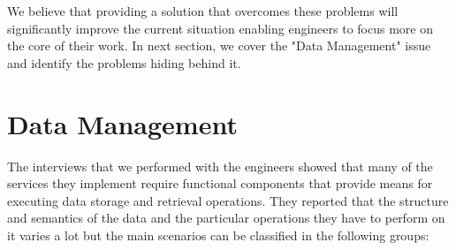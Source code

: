 We believe that providing a solution that overcomes these problems will significantly improve the current situation enabling engineers to focus more on the core of their work. In next section, we cover the "Data Management" issue and identify the problems hiding behind it.


\section{Data Management}
\label{sec:problemDefStorage}

The interviews that we performed with the engineers showed that many of the services they implement require functional components that provide means for executing data storage and retrieval operations. They reported that the structure and semantics of the data and the particular operations they have to perform on it varies a lot but the main scenarios can be classified in the following groups:

